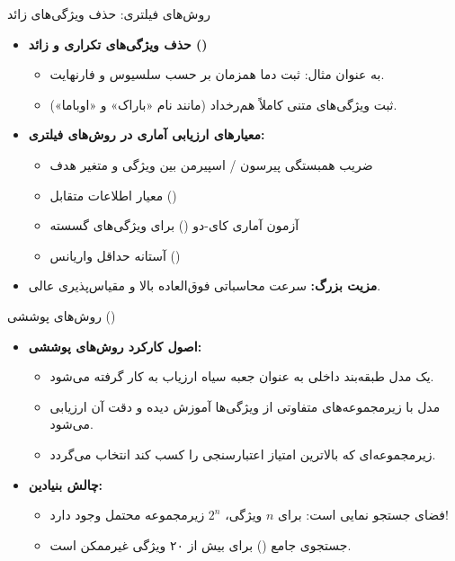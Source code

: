 \begin{frame}{روش‌های فیلتری: حذف ویژگی‌های زائد}
\begin{itemize}
  \item \textbf{حذف ویژگی‌های تکراری و زائد ()}
  \begin{itemize}
    \item به عنوان مثال: ثبت دما همزمان بر حسب سلسیوس و فارنهایت.
    \item ثبت ویژگی‌های متنی کاملاً هم‌رخداد (مانند نام «باراک» و «اوباما»).
  \end{itemize}
  \vspace{0.2cm}
  \item \textbf{معیارهای ارزیابی آماری در روش‌های فیلتری:}
  \begin{itemize}
    \item ضریب همبستگی پیرسون / اسپیرمن بین ویژگی و متغیر هدف
    \item معیار اطلاعات متقابل ()
    \item آزمون آماری کای-دو () برای ویژگی‌های گسسته
    \item آستانه حداقل واریانس ()
  \end{itemize}
  \vspace{0.2cm}
  \item \textbf{مزیت بزرگ:} سرعت محاسباتی فوق‌العاده بالا و مقیاس‌پذیری عالی.
\end{itemize}
\end{frame}

\begin{frame}{روش‌های پوششی ()}
\begin{itemize}
  \item \textbf{اصول کارکرد روش‌های پوششی:}
  \begin{itemize}
    \item یک مدل طبقه‌بند داخلی به عنوان جعبه سیاه ارزیاب به کار گرفته می‌شود.
    \item مدل با زیرمجموعه‌های متفاوتی از ویژگی‌ها آموزش دیده و دقت آن ارزیابی می‌شود.
    \item زیرمجموعه‌ای که بالاترین امتیاز اعتبارسنجی را کسب کند انتخاب می‌گردد.
  \end{itemize}
  \vspace{0.3cm}
  \item \textbf{چالش بنیادین:}
  \begin{itemize}
    \item فضای جستجو نمایی است: برای $n$ ویژگی، $2^n$ زیرمجموعه محتمل وجود دارد!
    \item جستجوی جامع () برای بیش از ۲۰ ویژگی غیرممکن است.
  \end{itemize}
\end{itemize}
\end{frame}

